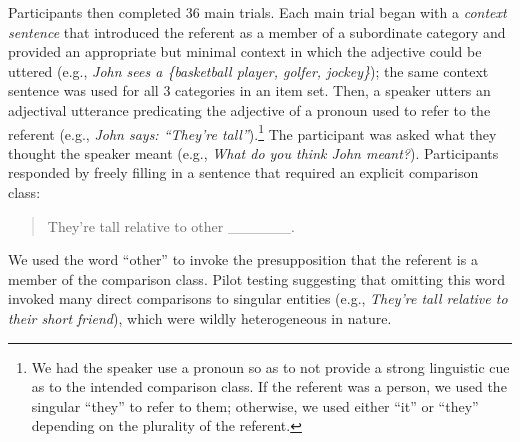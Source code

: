 \documentclass[doc, floatsintext]{apa6}
\begin{document}

Participants then completed 36 main trials. Each main trial began with a \emph{context sentence} that introduced the referent as a member of a subordinate category and provided an appropriate but minimal context in which the adjective could be uttered (e.g., \emph{John sees a \{basketball player, golfer, jockey\}}); the same context sentence was used for all 3 categories in an item set.
Then, a speaker utters an adjectival utterance predicating the adjective of a pronoun used to refer to the referent (e.g., \emph{John says: ``They're tall''}).\footnote{
We had the speaker use a pronoun so as to not provide a strong linguistic cue as to the intended comparison class. If the referent was a person, we used  the singular ``they'' to refer to them; otherwise, we used either ``it'' or ``they'' depending on the plurality of the referent.
}
The participant was asked what they thought the speaker meant (e.g., \emph{What do you think John meant?}). Participants responded by freely filling in a sentence that required an explicit comparison class:
\begin{quote}
They're tall relative to other \_\_\_\_\_\_.
\end{quote}
We used the word ``other'' to invoke the presupposition that the referent is a member of the comparison class. Pilot testing suggesting that omitting this word invoked many direct comparisons to singular entities (e.g., \emph{They're tall relative to their short friend}), which were wildly heterogeneous in nature.

\end{document}
